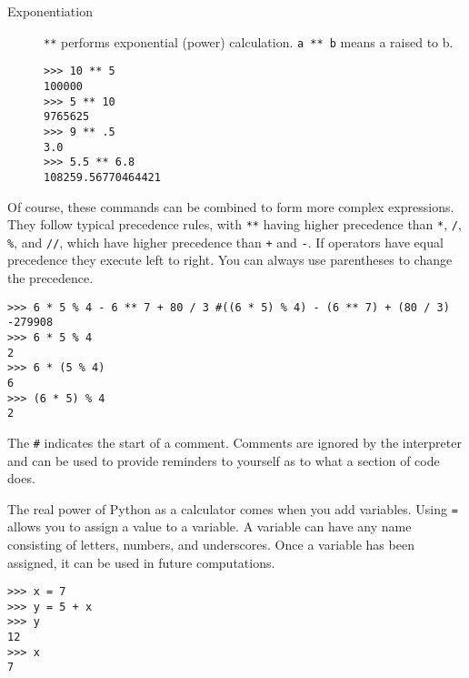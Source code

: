 \documentclass[12pt,hidelinks]{article}
\begin{document}
\begin{description}
  \item[Exponentiation] \texttt{**} performs exponential (power) calculation.
    \texttt{a ** b} means a raised to b.

    \begin{lstlisting}[style=bash]
>>> 10 ** 5
100000
>>> 5 ** 10 
9765625
>>> 9 ** .5
3.0
>>> 5.5 ** 6.8
108259.56770464421
    \end{lstlisting}

%
%
\end{description}


Of course, these commands can be combined to form more complex expressions. They
follow typical precedence rules, with \texttt{**} having higher precedence than
\texttt{*}, \texttt{/}, \texttt{\%}, and \texttt{//}, which have higher
precedence than \texttt{+} and \texttt{-}. If operators have equal precedence
they execute left to right. You can always use parentheses to change the
precedence.

\begin{lstlisting}[style=bash]
>>> 6 * 5 % 4 - 6 ** 7 + 80 / 3 #((6 * 5) % 4) - (6 ** 7) + (80 / 3)
-279908
>>> 6 * 5 % 4
2
>>> 6 * (5 % 4)
6
>>> (6 * 5) % 4
2
\end{lstlisting}

The \texttt{\#} indicates the start of a comment. Comments are ignored by the
interpreter and can be used to provide reminders to yourself as to what a
section of code does.

The real power of Python as a calculator comes when you add variables. Using
\texttt{=} allows you to assign a value to a variable. A variable can have any
name consisting of letters, numbers, and underscores. Once a variable has been
assigned, it can be used in future computations.

\begin{lstlisting}[style=bash]
>>> x = 7
>>> y = 5 + x
>>> y
12
>>> x
7
\end{lstlisting}
\end{document}
